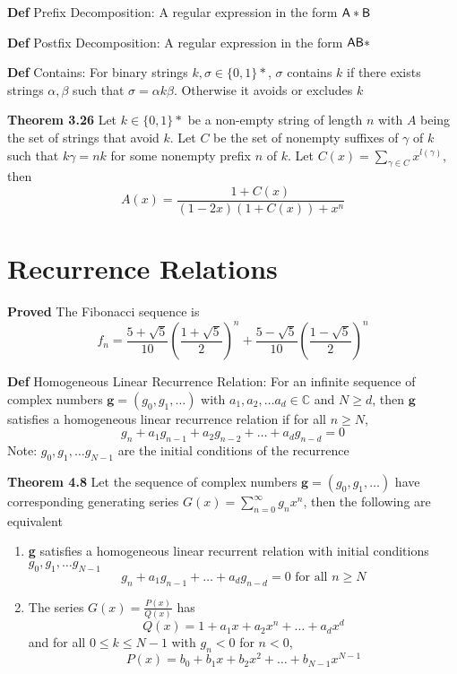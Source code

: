 \documentclass[11pt,notitlepage]{report}
\newcommand{\bb}[1]{\ensuremath{\mathbb{#1}}}
\newcommand{\tbf}[1]{\textbf{#1}}
\begin{document}
\tbf{Def} Prefix Decomposition: A regular expression in the form $\sf A*\sf B$

\tbf{Def} Postfix Decomposition: A regular expression in the form $\sf A\sf B*$

\tbf{Def} Contains: For binary strings $k, \sigma \in \{0,1\}*$, $\sigma$ contains $k$ if there exists strings $\alpha, \beta$ such that $\sigma = \alpha k \beta$. Otherwise it avoids or excludes $k$

\tbf{Theorem 3.26} Let $k \in \{0, 1\}*$ be a non-empty string of length $n$ with $A$ being the set of strings that avoid $k$. Let $C$ be the set of nonempty suffixes of $\gamma$ of $k$ such that $k \gamma = n k$ for some nonempty prefix $n$ of $k$. Let $C(x) = \sum_{\gamma \in C}x^{l(\gamma)}$, then
$$A(x) = \frac{1+C(x)}{(1-2x)(1+C(x)) + x^n}$$

\newpage
\section{Recurrence Relations}

\tbf{Proved} The Fibonacci sequence is
$$f_n = \frac{5 + \sqrt{5}}{10}\left(\frac{1+\sqrt{5}}{2}\right)^n + \frac{5 - \sqrt{5}}{10}\left(\frac{1-\sqrt{5}}{2}\right)^n$$

\tbf{Def} Homogeneous Linear Recurrence Relation: For an infinite sequence of complex numbers $\tbf{g} = (g_0,g_1,\dots)$ with $a_1,a_2,\dots a_d \in \bb C$ and $N \geq d$, then $\tbf g$ satisfies a homogeneous linear recurrence relation if for all $n \geq N$,
$$g_n + a_1g_{n-1} + a_2 g_{n-2} + \dots + a_dg_{n-d} = 0$$
\hspace*{5mm} Note: $g_0, g_1, \dots g_{N-1}$ are the initial conditions of the recurrence

\tbf{Theorem 4.8} Let the sequence of complex numbers $\tbf{g} = (g_0, g_1, \dots)$ have corresponding generating series $G(x) = \sum_{n=0}^\infty g_nx^n$, then the following are equivalent
\begin{enumerate}[label=\alph*)]
    \item \tbf{g} satisfies a homogeneous linear recurrent relation with initial conditions $g_0, g_1, \dots g_{N-1}$
    $$g_n + a_1g_{n-1} + \dots + a_dg_{n-d} = 0 \text{ for all }n \geq N$$
    \item The series $G(x) = \frac{P(x)}{Q(x)}$ has
    $$Q(x) = 1 + a_1x + a_2x^n + \dots + a_dx^d$$
    and for all $0 \leq k \leq N-1$ with $g_n < 0$ for $n < 0$,
    $$P(x) = b_0 + b_1x + b_2x^2 + \dots + b_{N-1} x^{N-1}$$
\end{enumerate}
\end{document}
